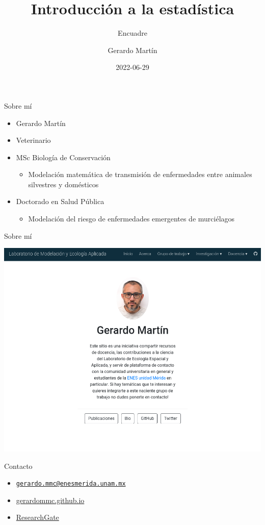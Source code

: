 \documentclass[
  11pt,
  ignorenonframetext,
]{beamer}
\title{Introducción a la estadística}
\subtitle{Encuadre}
\author{Gerardo Martín}
\date{2022-06-29}
\providecommand{\tightlist}{%
  \setlength{\itemsep}{0pt}\setlength{\parskip}{0pt}}
\begin{document}
\frame{\titlepage}

\begin{frame}{Sobre mí}
\protect\hypertarget{sobre-muxed}{}
\begin{itemize}
\item
  Gerardo Martín
\item
  Veterinario
\item
  MSc Biología de Conservación

  \begin{itemize}
  \tightlist
  \item
    Modelación matemática de transmisión de enfermedades entre animales
    silvestres y domésticos
  \end{itemize}
\item
  Doctorado en Salud Pública

  \begin{itemize}
  \tightlist
  \item
    Modelación del riesgo de enfermedades emergentes de murciélagos
  \end{itemize}
\end{itemize}
\end{frame}

\begin{frame}{Sobre mí}
\protect\hypertarget{sobre-muxed-1}{}
\begin{center}\includegraphics{Figuras Encuadre/Labo} \end{center}
\end{frame}

\begin{frame}{Contacto}
\protect\hypertarget{contacto}{}
\begin{itemize}
\tightlist
\item
  \href{mailto:gerardo.mmc@enesmerida.unam.mx}{\nolinkurl{gerardo.mmc@enesmerida.unam.mx}}
\item
  \href{https://gerardommc.github.io}{gerardommc.github.io}
\item
  \href{https://www.researchgate.net/profile/Gerardo-Martin}{ResearchGate}
\end{itemize}
\end{frame}
\end{document}

